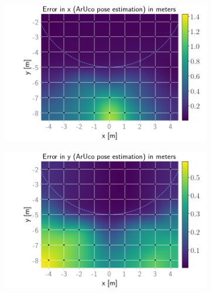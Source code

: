 \documentclass[../Head/report.tex]{subfiles}
\begin{document}
\begin{figure}[H]
    \centering
    \begin{subfigure}[t]{.337\textwidth}
        \centering
        \includegraphics[width=\textwidth]{../Figures/GPS2Vision_pose_estimation_test/test2_aruco_board_width_0.3_space_0.15/aruco_pose_estimation_error_x.png}
        \caption{}
        \label{fig:GPS2Vision_pose_estimation_test2_error_x}
    \end{subfigure}
    \hspace{-0.9em}
    \begin{subfigure}[t]{.337\textwidth}
        \centering
        \includegraphics[width=\textwidth]{../Figures/GPS2Vision_pose_estimation_test/test2_aruco_board_width_0.3_space_0.15/aruco_pose_estimation_error_y.png}
        \caption{}
        \label{fig:GPS2Vision_pose_estimation_test2_error_y}
    \end{subfigure}

\end{figure}
\end{document}

